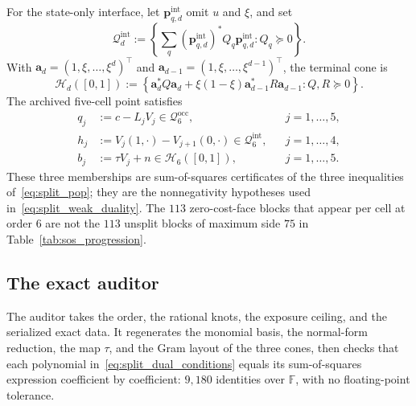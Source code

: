 \documentclass[aps,prx,reprint,nofootinbib,longbibliography,floatfix]{revtex4-2}
\theoremstyle{plain}
\theoremstyle{remark}
\begin{document}
For the state-only interface, let $\mathbf p^{\mathrm{int}}_{q,d}$ omit $u$ and $\xi$, and
set
\begin{equation}
\mathcal Q^{\mathrm{int}}_d
:=\left\{\sum_q(\mathbf p^{\mathrm{int}}_{q,d})^*Q_q\mathbf p^{\mathrm{int}}_{q,d}:Q_q\succeq0\right\}.
\label{eq:interface_cone}
\end{equation}
With $\mathbf a_d=(1,\xi,\ldots,\xi^d)^\top$ and
$\mathbf a_{d-1}=(1,\xi,\ldots,\xi^{d-1})^\top$, the terminal cone is
\begin{equation}
\mathcal H_d([0,1])
:=\left\{\mathbf a_d^*Q\mathbf a_d
+\xi(1-\xi)\mathbf a_{d-1}^*R\mathbf a_{d-1}:Q,R\succeq0\right\}.
\label{eq:terminal_cone}
\end{equation}
The archived five-cell point satisfies
\begin{subequations}
\label{eq:split_dual_conditions}
\begin{align}
q_j&:=c-L_jV_j\in\mathcal Q^{\mathrm{occ}}_6,
&& j=1,\ldots,5,\\
h_j&:=V_j(1,\cdot)-V_{j+1}(0,\cdot)\in\mathcal Q^{\mathrm{int}}_6,
&& j=1,\ldots,4,\\
b_j&:=\tau V_j+n\in\mathcal H_6([0,1]),
&& j=1,\ldots,5.
\end{align}
\end{subequations}
These three memberships are sum-of-squares certificates of the three
inequalities of~\eqref{eq:split_pop}; they are the nonnegativity hypotheses
used in~\eqref{eq:split_weak_duality}. The $113$ zero-cost-face blocks that
appear per cell at order $6$ are not the $113$ unsplit blocks of maximum
side $75$ in Table~\ref{tab:sos_progression}.

\subsection{The exact auditor}
\label{app:auditor}
The auditor takes the order, the rational knots, the exposure ceiling, and the
serialized exact data. It regenerates the monomial basis, the normal-form
reduction, the map $\tau$, and the Gram layout of the three cones, then checks
that each polynomial in~\eqref{eq:split_dual_conditions} equals its
sum-of-squares expression coefficient by coefficient: $9{,}180$ identities
over $\mathbb F$, with no floating-point tolerance.
\end{document}
